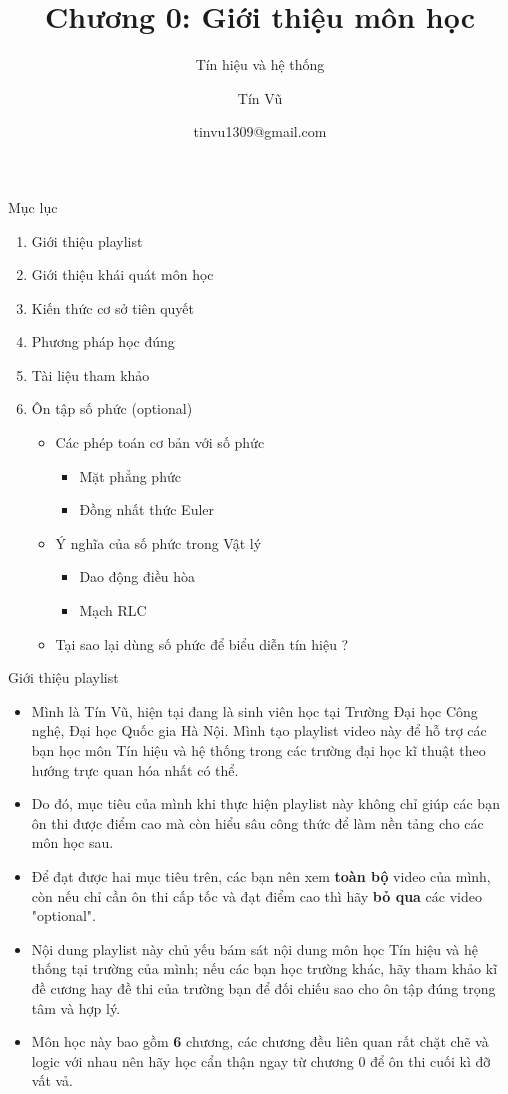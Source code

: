 \documentclass[8pt]{beamer}
\title[Chương 0: Giới thiệu môn học] %
{Chương 0: Giới thiệu môn học}
\subtitle{Tín hiệu và hệ thống}
\author[Tín hiệu và hệ thống] %
{Tín Vũ}
\date[VLC 2021] %
{tinvu1309@gmail.com}
\begin{document}
\frame{\titlepage}
\begin{frame}{Mục lục}
\tableofcontents
	\begin{enumerate}
		\item Giới thiệu playlist
		\item Giới thiệu khái quát môn học
		\item Kiến thức cơ sở tiên quyết
		\item Phương pháp học đúng
		\item Tài liệu tham khảo
		\item Ôn tập số phức (optional)
			\begin{itemize}
				\item Các phép toán cơ bản với số phức 
					\begin{itemize}
						\item Mặt phẳng phức
						\item Đồng nhất thức Euler
					\end{itemize}
				\item Ý nghĩa của số phức trong Vật lý
					\begin{itemize}
						\item Dao động điều hòa
						\item Mạch RLC
					\end{itemize}
				\item Tại sao lại dùng số phức để biểu diễn tín hiệu ?
			\end{itemize}
	\end{enumerate}
\end{frame}
\begin{frame}{Giới thiệu playlist}
	\begin{itemize}
		\item Mình là Tín Vũ, hiện tại đang là sinh viên học tại Trường Đại học Công nghệ, Đại học Quốc gia Hà Nội. Mình tạo playlist video này để hỗ trợ các bạn học môn Tín hiệu và hệ thống trong các trường đại học kĩ thuật theo hướng \alert{trực quan hóa} nhất có thể.
		\item Do đó, mục tiêu của mình khi thực hiện playlist này không chỉ giúp các bạn ôn thi được điểm cao mà còn \alert{hiểu sâu công thức để làm nền tảng cho các môn học sau}.
		\item Để đạt được hai mục tiêu trên, các bạn nên xem \textbf{toàn bộ} video của mình, còn nếu chỉ cần ôn thi cấp tốc và đạt điểm cao thì hãy \textbf{bỏ qua} các video "optional".
		\item Nội dung playlist này chủ yếu bám sát nội dung môn học Tín hiệu và hệ thống tại trường của mình; nếu các bạn học trường khác, hãy tham khảo kĩ đề cương hay đề thi của trường bạn để đối chiếu sao cho ôn tập đúng trọng tâm và hợp lý. 
		\item Môn học này bao gồm \textbf{6} chương, các chương đều liên quan rất chặt chẽ và logic với nhau nên hãy học cẩn thận ngay từ \alert{chương 0} để ôn thi cuối kì đỡ vất vả.
	\end{itemize}
\end{frame}
\end{document}
